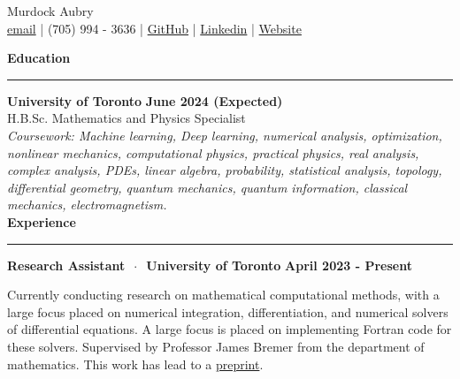 \documentclass{article}
\begin{document}
\begin{spacing}{1.2}

\centering\huge{Murdock Aubry}\small\\[0.20cm]
\href{mailto:murdock.aubry@mail.utoronto.ca}{\color{blue}email} \big| (705) 994 - 3636 \big| \href{https://github.com/murdock-aubry}{\color{blue}GitHub} \big| \href{https://www.linkedin.com/in/murdock-aubry}{\color{blue}Linkedin} \big| \href{https://murdockaubry.com/}{\color{blue}Website}
\flushleft
\vspace{-0.5cm}

\LARGE{\textbf{Education}}\\
\vspace{-0.2cm}
\noindent\rule{17cm}{0.7pt}
\large{\textbf{University of Toronto}} \hspace{\fill} \small\textbf{June 2024 (Expected)}\\
\normalsize H.B.Sc. Mathematics and Physics Specialist\\
\small\emph{Coursework: Machine learning, Deep learning, numerical analysis, optimization, 
nonlinear mechanics, computational physics, practical physics, real analysis, complex analysis, 
PDEs, linear algebra, probability, statistical analysis, topology, differential geometry, 
quantum mechanics, quantum information, classical mechanics, electromagnetism.}\\[0.20cm]

\LARGE{\textbf{Experience}}\normalsize\\
\vspace{-0.2cm}
\noindent\rule{17cm}{0.7pt}

\textbf{Research Assistant} $ \ \cdot \ $ \small{\textbf{University of Toronto}} \hspace{\fill} \textbf{April 2023 - Present}\\
\normalsize 

Currently conducting research on mathematical computational methods, with a large 
focus placed on numerical integration, differentiation, and numerical solvers of 
differential equations. A large focus is placed on implementing Fortran code for 
these solvers. Supervised by Professor James Bremer from the department 
of mathematics. This work has lead to a 
\href{https://arxiv.org/abs/2308.03288}{\color{blue}preprint}. \\ [0.10cm]



\end{spacing}
\end{document}
